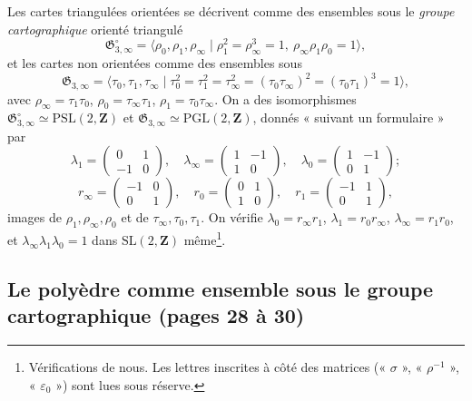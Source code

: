\documentclass[11pt,a4paper]{article}
\begin{document}
Les cartes triangulées orientées se décrivent comme des ensembles sous le
\emph{groupe cartographique} orienté triangulé
\[
  \mathfrak{G}^{\circ}_{3,\infty} = \langle \rho_0, \rho_1, \rho_\infty \mid
  \rho_1^2 = \rho_\infty^3 = 1,\ \rho_\infty\rho_1\rho_0 = 1 \rangle ,
\]
et les cartes non orientées comme des ensembles sous
\[
  \mathfrak{G}_{3,\infty} = \langle \tau_0, \tau_1, \tau_\infty \mid \tau_0^2 =
  \tau_1^2 = \tau_\infty^2 = (\tau_0\tau_\infty)^2 = (\tau_0\tau_1)^3 = 1
  \rangle ,
\]
avec $\rho_\infty = \tau_1\tau_0$, $\rho_0 = \tau_\infty\tau_1$, $\rho_1 =
\tau_0\tau_\infty$. On a des isomorphismes $\mathfrak{G}^{\circ}_{3,\infty}
\simeq \mathrm{PSL}(2, \mathbf{Z})$ et $\mathfrak{G}_{3,\infty} \simeq
\mathrm{PGL}(2, \mathbf{Z})$, donnés « suivant un formulaire » par
\[
  \lambda_1 = \begin{pmatrix} 0 & 1 \\ -1 & 0 \end{pmatrix}, \quad
  \lambda_\infty = \begin{pmatrix} 1 & -1 \\ 1 & 0 \end{pmatrix}, \quad
  \lambda_0 = \begin{pmatrix} 1 & -1 \\ 0 & 1 \end{pmatrix} ;
\]
\[
  r_\infty = \begin{pmatrix} -1 & 0 \\ 0 & 1 \end{pmatrix}, \quad
  r_0 = \begin{pmatrix} 0 & 1 \\ 1 & 0 \end{pmatrix}, \quad
  r_1 = \begin{pmatrix} -1 & 1 \\ 0 & 1 \end{pmatrix} ,
\]
images de $\rho_1, \rho_\infty, \rho_0$ et de $\tau_\infty, \tau_0, \tau_1$.
On vérifie $\lambda_0 = r_\infty r_1$, $\lambda_1 = r_0 r_\infty$,
$\lambda_\infty = r_1 r_0$, et $\lambda_\infty\lambda_1\lambda_0 = 1$ dans
$\mathrm{SL}(2, \mathbf{Z})$ même\footnote{Vérifications de nous. Les lettres
inscrites à côté des matrices (« $\sigma$ », « $\rho^{-1}$ », « $\varepsilon_0$ »)
sont lues sous réserve.}.

\subsection*{Le polyèdre comme ensemble sous le groupe cartographique (pages 28 à 30)}
\end{document}

